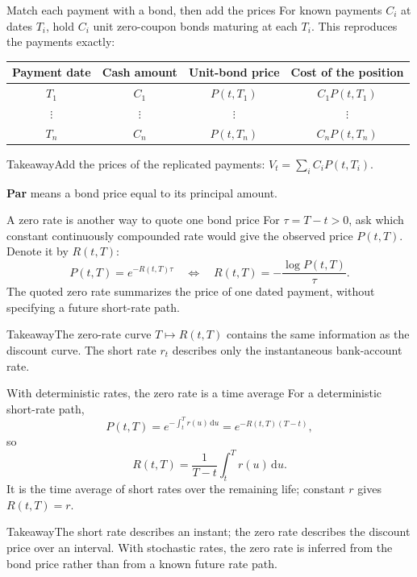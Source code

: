 \documentclass[handout,10pt,t,aspectratio=169]{beamer}
\newenvironment{keybox}{\begin{exampleblock}{Takeaway}}{\end{exampleblock}}
\newcommand{\dd}{\,\mathrm d}
\begin{document}
\begin{frame}{Match each payment with a bond, then add the prices}
\small
For known payments \(C_i\) at dates \(T_i\), hold \(C_i\) unit zero-coupon bonds
maturing at each \(T_i\). This reproduces the payments exactly:
\begin{center}\begin{tabular}{cccc}
\toprule Payment date & Cash amount & Unit-bond price & Cost of the position\\\midrule
\(T_1\) & \(C_1\) & \(P(t,T_1)\) & \(C_1P(t,T_1)\)\\
\(\vdots\) & \(\vdots\) & \(\vdots\) & \(\vdots\)\\
\(T_n\) & \(C_n\) & \(P(t,T_n)\) & \(C_nP(t,T_n)\)\\\bottomrule
\end{tabular}\end{center}
\begin{keybox}Add the prices of the replicated payments:
\(\displaystyle\boxed{V_t=\sum_i C_iP(t,T_i).}\)
\end{keybox}
\textbf{Par} means a bond price equal to its principal amount.
\end{frame}

\begin{frame}{A zero rate is another way to quote one bond price}
For \(\tau=T-t>0\), ask which constant continuously compounded rate
would give the observed price \(P(t,T)\). Denote it by \(R(t,T)\):
\[
 P(t,T)=e^{-R(t,T)\tau}
 \quad\Longleftrightarrow\quad
 \boxed{R(t,T)=-\frac{\log P(t,T)}{\tau}.}
\]
The quoted zero rate summarizes the price of one dated payment,
without specifying a future short-rate path.
\begin{keybox}The zero-rate curve \(T\mapsto R(t,T)\) contains the same
information as the discount curve. The short rate \(r_t\) describes only the instantaneous bank-account rate.\end{keybox}
\end{frame}

\begin{frame}{With deterministic rates, the zero rate is a time average}
For a deterministic short-rate path,
\[
 P(t,T)=e^{-\int_t^T r(u)\dd u}=e^{-R(t,T)(T-t)},
\]
so
\[
 \boxed{R(t,T)=\frac1{T-t}\int_t^T r(u)\dd u.}
\]
It is the time average of short rates over the remaining life; constant \(r\) gives \(R(t,T)=r\).
\begin{keybox}The short rate describes an instant; the zero rate describes the discount
price over an interval. With stochastic rates, the zero rate is inferred from
the bond price rather than from a known future rate path.\end{keybox}

\end{frame}
\end{document}
